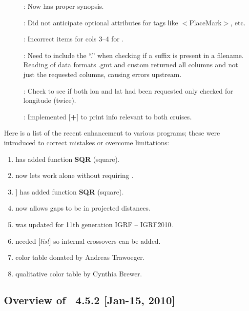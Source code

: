 \begin{description}
	\item []:	Now has proper synopsis.
	\item []:	Did not anticipate optional attributes for tags like $<$PlaceMark$>$, etc.
	\item []:	Incorrect items for cols 3--4 for .
	\item []:	Need to include the ``.'' when checking if a suffix is present in a filename.
		Reading of data formats .gmt and custom returned all columns and
		not just the requested columns, causing errors upstream.
	\item []:	Check to see if both lon and lat had been requested only
		checked for longitude (twice).
	\item []:	Implemented [{\bf +}] to print info relevant to both cruises.
\end{description}

Here is a list of the recent enhancement to various programs; these were introduced to correct mistakes or overcome limitations:

\begin{enumerate}
	\item {} has added function {\bf SQR} (square).
	\item {} now lets  work alone without requiring .
	\item {}] has added function {\bf SQR} (square).
	\item {}  now allows gaps to be in projected distances.
	\item {} was updated for 11th generation IGRF -- IGRF2010.
	\item {} needed [{\it list}] so internal crossovers can be added.
	\item {} color table donated by Andreas Trawoeger.
	\item {} qualitative color table by Cynthia Brewer.
\end{enumerate}


\subsection{Overview of \gmt\ 4.5.2 [Jan-15, 2010]}

